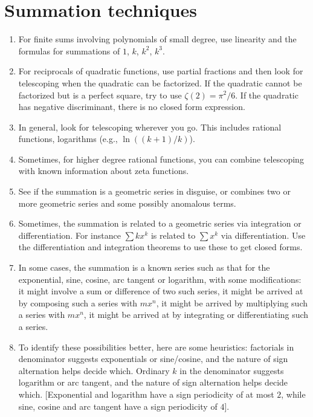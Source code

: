 \documentclass[10pt]{amsart}
\begin{document}
\section{Summation techniques}

\begin{enumerate}
\item For finite sums involving polynomials of small degree, use
  linearity and the formulas for summations of $1$, $k$, $k^2$, $k^3$.
\item For reciprocals of quadratic functions, use partial fractions
  and then look for telescoping when the quadratic can be
  factorized. If the quadratic cannot be factorized but is a perfect
  square, try to use $\zeta(2) = \pi^2/6$. If the quadratic has
  negative discriminant, there is no closed form expression.
\item In general, look for telescoping wherever you go. This includes
  rational functions, logarithms (e.g., $\ln((k + 1)/k)$).
\item Sometimes, for higher degree rational functions, you can combine
  telescoping with known information about zeta functions.
\item See if the summation is a geometric series in disguise, or
  combines two or more geometric series and some possibly anomalous
  terms.
\item Sometimes, the summation is related to a geometric series via
  integration or differentiation. For instance $\sum kx^k$ is related
  to $\sum x^k$ via differentiation. Use the differentiation and
  integration theorems to use these to get closed forms.
\item In some cases, the summation is a known series such as that for
  the exponential, sine, cosine, arc tangent or logarithm, with some
  modifications: it might involve a sum or difference of two such
  series, it might be arrived at by composing such a series with
  $mx^n$, it might be arrived by multiplying such a series with
  $mx^n$, it might be arrived at by integrating or differentiating
  such a series.
\item To identify these possibilities better, here are some
  heuristics: factorials in denominator suggests exponentials or
  sine/cosine, and the nature of sign alternation helps decide
  which. Ordinary $k$ in the denominator suggests logarithm or arc
  tangent, and the nature of sign alternation helps decide
  which. [Exponential and logarithm have a sign periodicity of at most
  $2$, while sine, cosine and arc tangent have a sign periodicity of
  $4$].
\end{enumerate}
\end{document}
